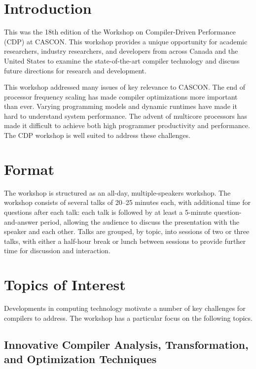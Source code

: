 \documentclass[sigconf]{acmart}
\begin{document}
\maketitle

\section{Introduction}
This was the 18th edition of the Workshop on Compiler-Driven Performance (CDP) at CASCON. This workshop provides a unique opportunity for academic researchers, industry researchers, and developers from across Canada and the United States to examine the state-of-the-art compiler technology and discuss future directions for research and development.

This workshop addressed many issues of key relevance to CASCON. The end of processor frequency scaling has made compiler optimizations more important than ever. Varying programming models and dynamic runtimes have made it hard to understand system performance. The advent of multicore processors has made it difficult to achieve both high programmer productivity and performance. The CDP workshop is well suited to address these challenges.

\section{Format}
The workshop is structured as an all-day, multiple-speakers workshop. The workshop consists of several talks of 20--25 minutes each, with additional time for questions after each talk: each talk is followed by at least a 5-minute question-and-answer period, allowing the audience to discuss the presentation with the speaker and each other. Talks are grouped, by topic, into sessions of two or three talks, with either a half-hour break or lunch between sessions to provide further time for discussion and interaction. 

\section{Topics of Interest}
Developments in computing technology motivate a number of key challenges for compilers to address. The workshop has a particular focus on the following topics.

\subsection{Innovative Compiler Analysis, Transformation, and Optimization Techniques}
\end{document}
